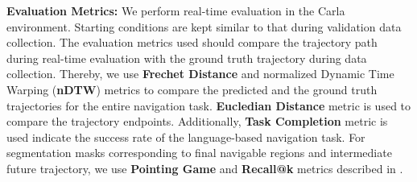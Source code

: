 \documentclass[11pt]{article}
\begin{document}
\textbf{Evaluation Metrics:} We perform real-time evaluation in the Carla environment. Starting conditions are kept similar to that during validation data collection. The evaluation metrics used should compare the trajectory path during real-time evaluation with the ground truth trajectory during data collection. Thereby, we use \textbf{Frechet Distance} and normalized Dynamic Time Warping (\textbf{nDTW}) metrics to compare the predicted and the ground truth trajectories for the entire navigation task. \textbf{Eucledian Distance} metric is used to compare the trajectory endpoints. Additionally, \textbf{Task Completion} metric is used indicate the success rate of the language-based navigation task. For segmentation masks corresponding to final navigable regions and intermediate future trajectory, we use \textbf{Pointing Game} and \textbf{Recall@k} metrics described in \cite{Rufus_2021}. 





\end{document}
